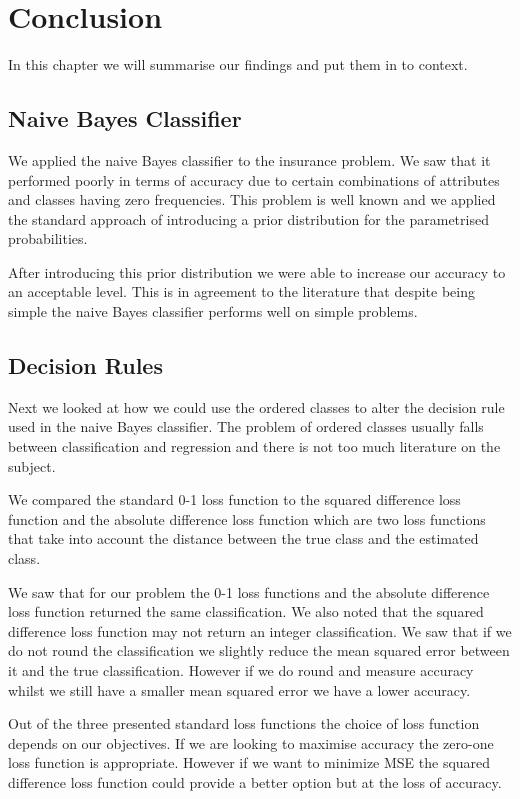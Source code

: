 \chapter{Conclusion}

In this chapter we will summarise our findings and put them in to context.

\section{Naive Bayes Classifier}

We applied the naive Bayes classifier to the insurance problem.
We saw that it performed poorly in terms of accuracy due to certain combinations of attributes and classes having zero frequencies.
This problem is well known and we applied the standard approach of introducing a prior distribution for the parametrised probabilities.

After introducing this prior distribution we were able to increase our accuracy to an acceptable level.
This is in agreement to the literature that despite being simple the naive Bayes classifier performs well on simple problems.

\section{Decision Rules}

Next we looked at how we could use the ordered classes to alter the decision rule used in the naive Bayes classifier.
The problem of ordered classes usually falls between classification and regression and there is not too much literature on the subject.

We compared the standard 0-1 loss function to the squared difference loss function and the absolute difference loss function which are two loss functions that take into account the distance between the true class and the estimated class.

We saw that for our problem the 0-1 loss functions and the absolute difference loss function returned the same classification.
We also noted that the squared difference loss function may not return an integer classification.
We saw that if we do not round the classification we slightly reduce the mean squared error between it and the true classification.
However if we do round and measure accuracy whilst we still have a smaller mean squared error we have a lower accuracy.

Out of the three presented standard loss functions the choice of loss function depends on our objectives.
If we are looking to maximise accuracy the zero-one loss function is appropriate.
However if we want to minimize MSE the squared difference loss function could provide a better option but at the loss of accuracy.

